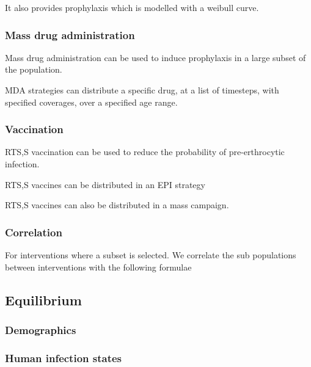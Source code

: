 \documentclass{bmcart}
\begin{document}
It also provides prophylaxis which is modelled with a weibull curve.



\subsubsection*{Mass drug administration}

Mass drug administration can be used to induce prophylaxis in a large subset of the population.

MDA strategies can distribute a specific drug, at a list of timesteps, with specified coverages, over a specified age range.

\subsubsection*{Vaccination}

RTS,S vaccination can be used to reduce the probability of pre-erthrocytic infection.


RTS,S vaccines can be distributed in an EPI strategy %


RTS,S vaccines can also be distributed in a mass campaign.

\subsubsection*{Correlation}

For interventions where a subset is selected. We correlate the sub populations between interventions with the following formulae


\subsection*{Equilibrium}

\subsubsection*{Demographics}

\subsubsection*{Human infection states}
\end{document}
